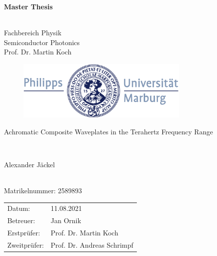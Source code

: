 \documentclass[12pt, a4paper]{report}
\begin{document}
\captionsetup[subfigure]{justification=justified,singlelinecheck=false}

\begin{titlepage}
  \vspace{3cm}
  \thispagestyle{empty}
  \begin{center}
    \begin{LARGE}
      \textbf{Master Thesis}
    \end{LARGE}\\
    Fachbereich Physik \\
    Semiconductor Photonics \\
    Prof. Dr. Martin Koch
    \\[1cm]
    \begin{figure}[h]
    \hspace{0.8cm}
      \centering
      \includegraphics[width=0.75\textwidth]{images/title_logo.pdf}
    \end{figure}
    \vspace{2cm}
    \begin{LARGE}
      Achromatic Composite Waveplates in the Terahertz Frequency Range
    \end{LARGE}\\[2cm]
    \begin{LARGE}
      Alexander Jäckel
    \end{LARGE}
    \\
    Matrikelnummer: 2589893
  \end{center}
  \vfill
    \noindent\begin{tabular}{ll}
      Datum: & 11.08.2021 \\
      Betreuer: & Jan Ornik \\
      Erstprüfer: & Prof. Dr. Martin Koch \\
      Zweitprüfer: & Prof. Dr. Andreas Schrimpf  \\
    \end{tabular}
\end{titlepage}
\end{document}
